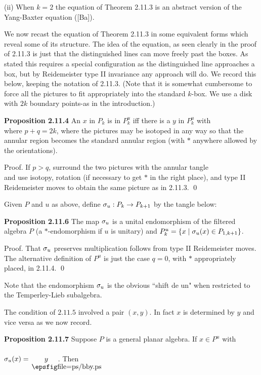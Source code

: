 (ii) When $k=2$ the equation of Theorem 2.11.3 is an abstract
version of the Yang-Baxter equation ([Ba]).

\bs We now recast the equation of Theorem 2.11.3 in some equivalent
forms which reveal some of its structure. The idea of the equation,
as seen clearly in the proof of 2.11.3 is just that the
distinguished lines can move freely past the boxes. As stated this
requires a special configuration as the distinguished line
approaches a box, but by Reidemeister type II invariance any
approach will do. We record this below, keeping the notation of
2.11.3. (Note that it is somewhat cumbersome to force all the
pictures to fit appropriately into the standard $k$-box. We use a
disk with $2k$ boundary points-as in the introduction.)

\medskip
{\bf Proposition 2.11.4} An $x$ in $P_k$ is in $P^u_k$ iff
there is a $y$ in $P^u_k$ with
\[
	
\]
\ni where $p+q=2k$, where the pictures may be isotoped in any way
so that the annular region becomes the standard annular region
(with $*$ anywhere allowed by the orientations).

\medskip
{\sc Proof.} If $p>q$, surround the two pictures with the annular
tangle
\[
	
\]
\ni and  use isotopy, rotation (if necessary to get $*$ in the
right place), and type II Reidemeister moves to obtain the same
picture as in 2.11.3. \qed

 Given $P$ and $u$ as above, define
$\sigma_u:P_k\to P_{k+1}$ by the tangle below:
\[
	
\]

\bs\ni
{\bf Proposition 2.11.6} The map $\sigma_u$ is a unital
endomorphism of the filtered algebra $P$ (a $*$-endomorphism if $u$
is unitary) and $P^u_k=\{x\mid \sigma_u(x)\in P_{1,k+1}\}$.

\bs
{\sc Proof.}  That $\sigma_u$ preserves multiplication follows from
type II Reidemeister moves. The alternative definition of $P^u$ is
just the case $q=0$, with $*$ appropriately placed, in 2.11.4. \qed

\bs Note that the endomorphism $\sigma_u$ is the obvious ``shift de un"
when restricted to the Temperley-Lieb subalgebra.

The condition of $2.11.5$ involved a pair $(x,y)$. In fact $x$ is
determined by $y$ and vice versa as we now record.

\bs\ni
{\bf Proposition 2.11.7} Suppose $P$ is a general planar
algebra. If $x\in P^u$ with \ $\sigma_u(x)=$ $\boxi{y}$.
Then

\medskip
\[
	
\]

